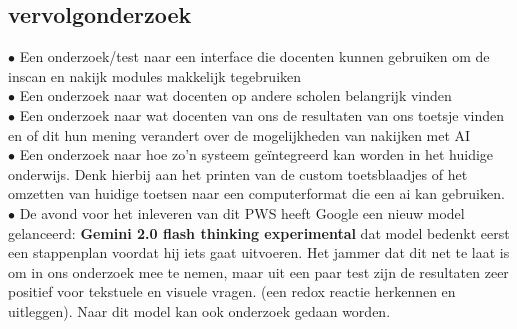 \documentclass[12pt]{article}
\begin{document}
\begin{multicols}{2}
\begin{minipage}{\linewidth}
\subsection{vervolgonderzoek}
$\bullet$ Een onderzoek/test naar een interface die docenten kunnen gebruiken om de inscan en nakijk modules makkelijk tegebruiken\\
$\bullet$ Een onderzoek naar wat docenten op andere scholen belangrijk vinden\\
$\bullet$ Een onderzoek naar wat docenten van ons de resultaten van ons toetsje vinden en of dit hun mening verandert over de mogelijkheden van nakijken met AI\\
$\bullet$ Een onderzoek naar hoe zo'n systeem geïntegreerd kan worden in het huidige onderwijs. Denk hierbij aan het printen van de custom toetsblaadjes of het omzetten van huidige toetsen naar een computerformat  die een ai kan gebruiken.\\
$\bullet$ De avond voor het inleveren van dit PWS heeft Google een nieuw model gelanceerd: \textbf{Gemini 2.0 flash thinking experimental} dat model bedenkt eerst een stappenplan voordat hij iets gaat uitvoeren. Het jammer dat dit net te laat is om in ons onderzoek mee te nemen, maar uit een paar test zijn de resultaten zeer positief voor tekstuele en visuele vragen. (een redox reactie herkennen en uitleggen). Naar dit model kan ook onderzoek gedaan worden.\\
\end{minipage}
\end{multicols}
\pagebreak
\end{document}
